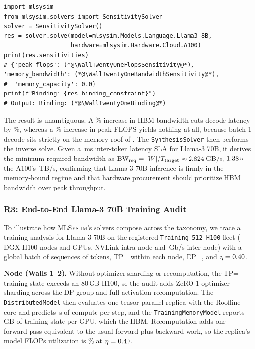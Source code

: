 \documentclass[10pt,twocolumn]{article}
\newcommand{\mlsysim}{\mbox{\textsc{MLSys}\,\textperiodcentered\,\textsc{im}}\xspace}
\begin{document}
\begin{lstlisting}[caption={\textbf{Sensitivity Analysis.} Identifying the binding constraint via 10\% hardware perturbations.},label={lst:sensitivity}]
import mlsysim
from mlsysim.solvers import SensitivitySolver
solver = SensitivitySolver()
res = solver.solve(model=mlsysim.Models.Language.Llama3_8B,
                   hardware=mlsysim.Hardware.Cloud.A100)
print(res.sensitivities)
# {'peak_flops': (*@\WallTwentyOneFlopsSensitivity@*), 'memory_bandwidth': (*@\WallTwentyOneBandwidthSensitivity@*),
#  'memory_capacity': 0.0}
print(f"Binding: {res.binding_constraint}")
# Output: Binding: (*@\WallTwentyOneBinding@*)
\end{lstlisting}

The result is unambiguous. A \WallTwentyOnePerturbationPct\% increase in HBM bandwidth cuts decode latency by \WallTwentyOneBandwidthCutPct\%, whereas a \WallTwentyOnePerturbationPct\% increase in peak FLOPS yields nothing at all, because batch-1 decode sits strictly on the memory roof of . The \texttt{SynthesisSolver} then performs the inverse solve. Given a \WallTwentyTwoTargetMs\,ms inter-token latency SLA for Llama-3 70B, it derives the minimum required bandwidth as $\text{BW}_{\text{req}} = |W| / T_{\text{target}} \approx 2{,}824$\,GB/s, $1.38{\times}$ the A100's \RegAhBandwidthTBs\,TB/s, confirming that Llama-3 70B inference is firmly in the memory-bound regime and that hardware procurement should prioritize HBM bandwidth over peak throughput.

\subsubsection{R3: End-to-End Llama-3 70B Training Audit}
To illustrate how \mlsysim's solvers compose across the taxonomy, we trace a training analysis for Llama-3 70B on the registered \texttt{Training\_512\_H100} fleet (\CaseRThreeNodes{} DGX H100 nodes and \CaseRThreeGpus{} GPUs, NVLink intra-node and \CaseRThreeFabricGbps\,Gb/s \CaseRThreeFabric{} inter-node) with a global batch of \CaseRThreeBatch{} sequences of \CaseRThreeSeqLen{} tokens, TP=\CaseRThreeTp{} within each node, DP=\CaseRThreeDp, and $\eta = 0.40$.

\textbf{Node (Walls 1--2).} Without optimizer sharding or recomputation, the TP=\CaseRThreeTp{} training state exceeds an 80\,GB H100, so the audit adds ZeRO-1 optimizer sharding across the DP group and full activation recomputation. The \texttt{DistributedModel} then evaluates one tensor-parallel replica with the Roofline core and predicts \CaseRThreeComputeSeconds\,s of compute per step, and the \texttt{TrainingMemoryModel} reports \CaseRThreePerGpuMemoryGB\,GB of training state per GPU, which \CaseRThreeMemoryFits{} the HBM. Recomputation adds one forward-pass equivalent to the usual forward-plus-backward work, so the replica's model FLOPs utilization is \CaseRThreeReplicaMfuPct\% at $\eta = 0.40$.
\end{document}
